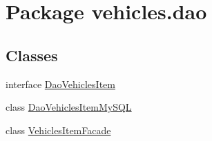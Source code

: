 \hypertarget{namespacevehicles_1_1dao}{}\section{Package vehicles.\+dao}
\label{namespacevehicles_1_1dao}
\subsection*{Classes}
\begin{DoxyCompactItemize}
\item 
interface \mbox{\hyperlink{interfacevehicles_1_1dao_1_1_dao_vehicles_item}{Dao\+Vehicles\+Item}}
\item 
class \mbox{\hyperlink{classvehicles_1_1dao_1_1_dao_vehicles_item_my_s_q_l}{Dao\+Vehicles\+Item\+My\+S\+QL}}
\item 
class \mbox{\hyperlink{classvehicles_1_1dao_1_1_vehicles_item_facade}{Vehicles\+Item\+Facade}}
\end{DoxyCompactItemize}
